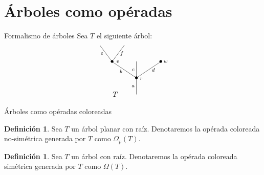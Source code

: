 \documentclass[12pt,aspectratio=169]{beamer}
\numberwithin{equation}{section}
\theoremstyle{definition}
\newtheorem{defi}[teo]{Definici\'on}
\begin{document}
{\section{\'Arboles como op\'eradas}

\begin{frame}{Formalismo de \'arboles}
    Sea $T$ el siguiente \'arbol:
    $$
        \xy
        <0.08cm, 0cm>:
        (0.0, 0.0)*{}="1"; %
        (0.0, 10.0)*=0{\bullet}="2"; %
        (-15.0, 20.0)*=0{\bullet}="3"; %
        (-22.5, 30.0)*{}="4"; %
        (-7.5, 30.0)*{}="5"; %
        (0.0, 20.0)*{}="6"; %
        (15.0, 20.0)*=0{\bullet}="7"; %
        "1";"2" **\dir{-};
        "2";"3" **\dir{-};
        "3";"4" **\dir{-};
        "3";"5" **\dir{-};
        "2";"6" **\dir{-};
        "2";"7" **\dir{-};
        (3.0, 9.5)*=0{\scriptstyle r};
        (-11.5, 20.0)*=0{\scriptstyle v};
        (-2.0, 5.0)*=0{\scriptstyle a};
        (-9.5, 14.0)*=0{\scriptstyle b};
        (-21.3, 25.0)*=0{\scriptstyle e};
        (-9, 25.0)*=0{\scriptstyle f};
        (-2.0, 15.0)*=0{\scriptstyle c};
        (10.4, 15.0)*=0{\scriptstyle d};
        (18.0, 20.0)*=0{\scriptstyle w};
        (-13,0)*{T};
        \endxy
    $$

\end{frame}
\begin{frame}{\'Arboles como op\'eradas coloreadas}
    \begin{defi}
        Sea $T$ un \'arbol planar con ra\'iz. Denotaremos la op\'erada coloreada no-sim\'etrica generada por $T$ como $\Omega_p(T)$.
    \end{defi}
    \begin{defi}
        Sea $T$ un \'arbol con ra\'iz. Denotaremos la op\'erada coloreada sim\'etrica generada por $T$ como $\Omega(T)$.
    \end{defi}
\end{frame}

}
\end{document}
